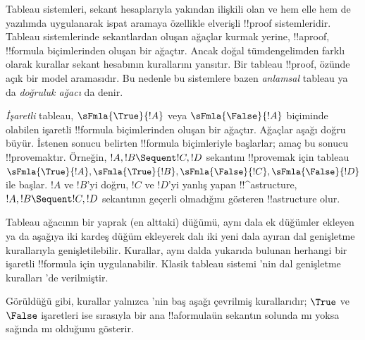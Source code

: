 



Tableau sistemleri, sekant hesaplarıyla yakından ilişkili olan ve hem
elle hem de yazılımda uygulanarak ispat aramaya özellikle elverişli
!!{proof} sistemleridir. Tableau sistemlerinde sekantlardan oluşan ağaçlar
kurmak yerine, !!a{proof}, !!{formula} biçimlerinden oluşan bir ağaçtır. Ancak
doğal tümdengelimden farklı olarak kurallar sekant hesabının kurallarını
yansıtır. Bir tableau !!{proof}, özünde açık bir model aramasıdır. Bu
nedenle bu sistemlere bazen \emph{anlamsal} tableau ya da \emph{doğruluk
ağacı} da denir.

\emph{İşaretli} tableau, $\sFmla{\True}{!A}$ veya
$\sFmla{\False}{!A}$ biçiminde olabilen işaretli !!{formula} biçimlerinden
oluşan bir ağaçtır. Ağaçlar aşağı doğru büyür. İstenen sonucu belirten
!!{formula} biçimleriyle başlarlar; amaç bu sonucu !!{prove}{}maktır. Örneğin,
$!A, !B \Sequent !C, !D$ sekantını !!{prove}{}mak için tableau
$\sFmla{\True}{!A}, \sFmla{\True}{!B},
\sFmla{\False}{!C}, \sFmla{\False}{!D}$ ile başlar.
$!A$ ve $!B$'yi doğru, $!C$ ve $!D$'yi yanlış yapan !!^a{structure},
$!A, !B \Sequent !C, !D$ sekantının geçerli olmadığını gösteren
!!a{structure} olur.

Tableau ağacının bir yaprak (en alttaki) düğümü, aynı dala ek düğümler
ekleyen ya da aşağıya iki kardeş düğüm ekleyerek dalı iki yeni dala
ayıran dal genişletme kurallarıyla genişletilebilir. Kurallar, aynı
dalda yukarıda bulunan herhangi bir işaretli !!{formula} için
uygulanabilir. Klasik tableau sistemi 'nin dal genişletme
kuralları 'de verilmiştir.


Görüldüğü gibi, kurallar yalnızca 'nin baş aşağı çevrilmiş
kurallarıdır; $\True$ ve $\False$ işaretleri ise sırasıyla bir
ana !!a{formula}{}ün sekantın solunda mı yoksa sağında mı
olduğunu gösterir.

